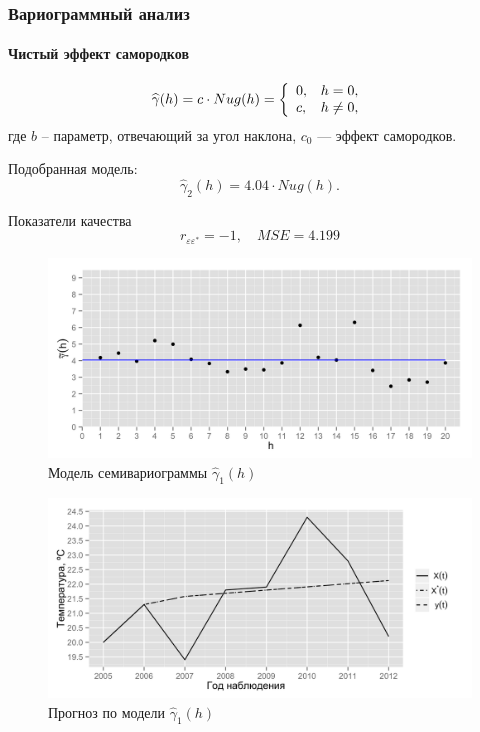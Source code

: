 \documentclass{beamer}
\begin{document}
\begin{frame}
  \frametitle{Вариограммный анализ}
  \framesubtitle{Чистый эффект самородков}
  \begin{multicols}{2}
  \begin{equation}\begin{gathered}
  \label{eq:nug}
    \widehat{\gamma}(h) = c \cdot Nug(h) = \left\{
   \begin{array}{l l}
     0, & h = 0, \\
     c, & h \neq 0,
   \end{array} \right.
  \end{gathered}\end{equation}
  где $ b $ -- параметр, отвечающий за угол наклона, $ c_0 $ --- эффект самородков.

  \medskip

  Подобранная модель:
  \begin{equation}
  \label{eq:gamma2}
    \widehat{\gamma}_2(h) = 4.04 \cdot Nug(h).
  \end{equation}

  Показатели качества
  \begin{equation*}
    r_{\varepsilon\varepsilon^{*}} = -1, \quad MSE = 4.199
  \end{equation*}

  \columnbreak
  \vspace{-14.5pt}
  \begin{figure}[H]
    \includegraphics[width=0.9\linewidth]{../../figures/variogram/lin-fit-modeled.png} \\
    \caption{Модель семивариограммы $\widehat{\gamma}_1(h)$}
    \includegraphics[width=0.9\linewidth]{../../figures/variogram/lin-fit-cross-prediction.png}
    \caption{Прогноз по модели $\widehat{\gamma}_1(h)$}
  \end{figure}
  \end{multicols}
\end{frame}
\end{document}
